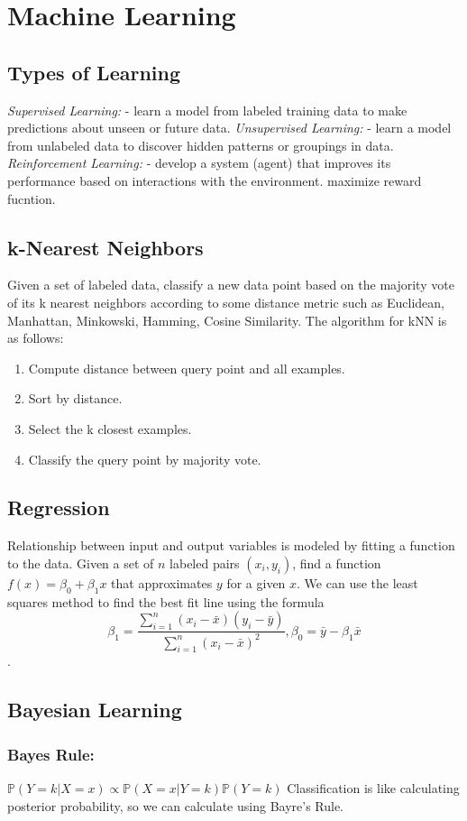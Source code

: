 \section{Machine Learning}
\subsection{Types of Learning}
\emph{Supervised Learning:} - learn a model from labeled training data to make predictions about unseen or future data.
\emph{Unsupervised Learning:} - learn a model from unlabeled data to discover hidden patterns or groupings in data.
\emph{Reinforcement Learning:} - develop a system (agent) that improves its performance based on interactions with the environment. maximize reward fucntion.
\subsection{k-Nearest Neighbors}
Given a set of labeled data, classify a new data point based on the majority vote of its k nearest neighbors according to some distance metric such as Euclidean, Manhattan, Minkowski, Hamming, Cosine Similarity. The algorithm for kNN is as follows:
\begin{enumerate}
    \item Compute distance between query point and all examples.
    \item Sort by distance.
    \item Select the k closest examples.
    \item Classify the query point by majority vote.
\end{enumerate}
\subsection{Regression}
Relationship between input and output variables is modeled by fitting a function to the data. Given a set of $n$ labeled pairs $(x_i,y_i)$, find a function $f(x)=\beta_0+\beta_1 x$ that approximates $y$ for a given $x$. We can use the least squares method to find the best fit line using the formula \[\beta_1=\frac{\sum^n_{i=1}(x_i-\bar{x})(y_i-\bar{y})}{\sum^n_{i=1}(x_i-\bar{x})^2}, \beta_0=\bar{y}-\beta_1\bar{x}\].
\subsection{Bayesian Learning}
\subsubsection{Bayes Rule:} $\mathbb{P}(Y=k|X=x) \propto \mathbb{P}(X=x|Y=k)\mathbb{P}(Y=k)$ Classification is like calculating posterior probability, so we can calculate using Bayre's Rule.
